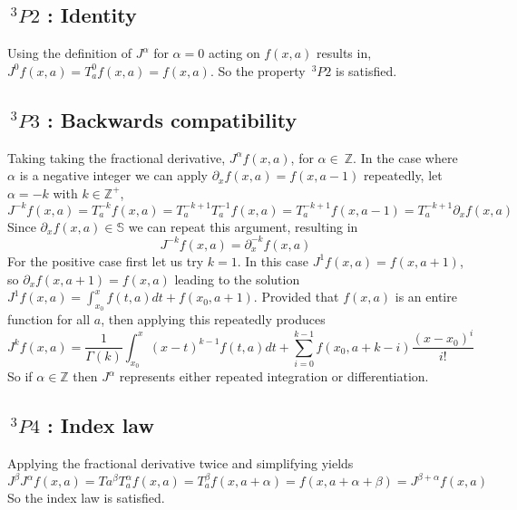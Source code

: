 \documentclass[%
 onecolumn,
 amsmath, amssymb, aps, pra, 10pt
]{revtex4-2}
\begin{document}
\subsection*{$\,^3P2$ : Identity}
Using the definition of $J^{\alpha}$ for $\alpha=0$ acting on $f(x, a)$ results in, $J^{0}f(x, a) = T_{a}^{0}f(x, a) = f(x, a)$. So the property $\,^3P2$ is satisfied.

\subsection*{$\,^3P3$ : Backwards compatibility}
Taking taking the fractional derivative, $J^{\alpha} f(x, a)$, for $\alpha \in\ \mathbb{Z}$. In the case where $\alpha$ is a negative integer we can apply $\partial_x f(x, a) = f(x, a - 1)$ repeatedly, let $\alpha = -k$ with $k \in \mathbb{Z}^+$,
$$J^{-k} f(x, a) = T_{a}^{-k} f(x, a)=T_{a}^{-k + 1}T_{a}^{-1} f(x, a) = T_{a}^{-k + 1}f(x, a - 1) = T_{a}^{-k + 1}\partial_x f(x, a)$$
Since $\partial_x f(x, a) \in \mathbb{S}$ we can repeat this argument, resulting in
$$J^{-k} f(x, a) = \partial_{x}^{-k} f(x, a)$$
For the positive case first let us try $k=1$. In this case $J^{1} f(x, a) = f(x, a + 1)$, so $\partial_x f(x, a + 1) = f(x, a)$ leading to the solution $J^{1} f(x, a) = \int_{x_0}^{x} f(t, a)dt + f(x_0, a + 1)$. Provided that $f(x, a)$ is an entire function for all $a$, then applying this repeatedly produces
$$J^{k} f(x, a) = \frac{1}{\Gamma(k)}\int_{x_0}^{x} (x - t)^{k - 1}f(t, a)dt + \sum_{i = 0}^{k - 1}f(x_0, a + k - i)\frac{(x - x_0)^i}{i!}$$
So if $\alpha \in \mathbb{Z}$ then $J^{\alpha}$ represents either repeated integration or differentiation.

\subsection*{$\,^3P4$ : Index law}
Applying the fractional derivative twice and simplifying yields
$$J^{\beta}J^{\alpha} f(x, a) = T{a}^{\beta}T_{a}^{\alpha} f(x, a) = T_{a}^{\beta} f(x, a + \alpha) = f(x, a + \alpha + \beta) = J^{\beta + \alpha} f(x, a)$$
So the index law is satisfied.
\end{document}
